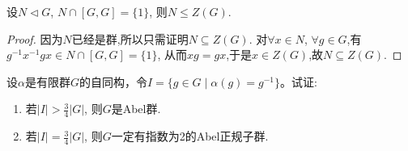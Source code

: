 \documentclass[../../main.tex]{subfiles}%
\begin{document}
\begin{example}
设$N \lhd G$, $N \cap [G,G] = \{1\}$, 则$N \leqslant Z(G)$.
\end{example}
\begin{proof}
因为$N$已经是群,所以只需证明$N\subseteq Z(G)$.
对$\forall x \in N$, $\forall g \in G$,有$g^{-1}x^{-1}gx \in N \cap [G,G] = \{1\}$, 从而$xg=gx$,于是$x \in Z(G)$,故$N\subseteq Z(G)$.
\end{proof}

\begin{example}
设$\alpha$是有限群$G$的自同构，令$I = \{g \in G \mid \alpha(g) = g^{-1}\}$。试证:
\begin{enumerate}[(1)]
\item 若$|I| > \frac{3}{4}|G|$, 则$G$是Abel群.
\item 若$|I| = \frac{3}{4}|G|$, 则$G$一定有指数为2的Abel正规子群.
\end{enumerate}
\end{example}
\end{document}
